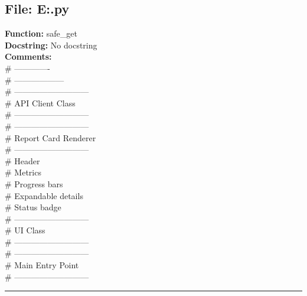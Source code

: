 {\subsection*{File: E:\project\capstone\frontend\view.py}
\textbf{Function:} safe_get\\
\textbf{Docstring:} No docstring\\
\textbf{Comments:}\\
# -------------\\
# ------------------\\
# ---------------------------\\
# API Client Class\\
# ---------------------------\\
# ---------------------------\\
# Report Card Renderer\\
# ---------------------------\\
# Header\\
# Metrics\\
# Progress bars\\
# Expandable details\\
# Status badge\\
# ---------------------------\\
# UI Class\\
# ---------------------------\\
# ---------------------------\\
# Main Entry Point\\
# ---------------------------\\

\hrule

}
